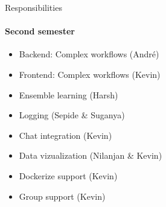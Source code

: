 \begin{frame}{Responsibilities}
\framesubtitle{Second semester}
	\begin{itemize}
		\item Backend: Complex workflows (André)
		\item Frontend: Complex workflows (Kevin)
		\item Ensemble learning  (Harsh)
		\item Logging (Sepide \& Suganya)
		\item Chat integration (Kevin)
		\item Data vizualization (Nilanjan \& Kevin)
		\item Dockerize support (Kevin)
		\item Group support (Kevin)
	\end{itemize}
\end{frame}